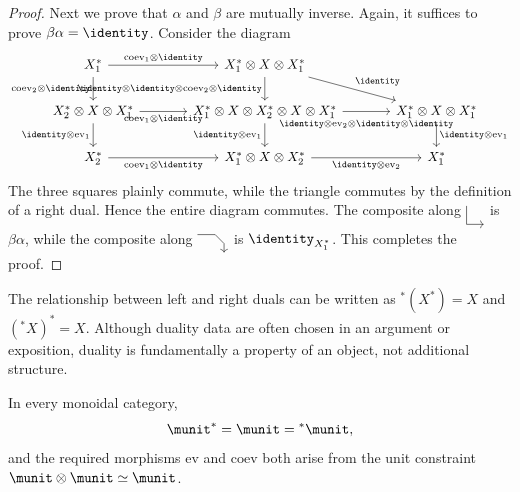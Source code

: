 \begin{proof}
	Next we prove that $\alpha$ and $\beta$ are mutually inverse. Again, it
	suffices to prove $\beta\alpha=\identity$. Consider the diagram
	\[\begin{tikzcd}[column sep=large]
		X_1^* \arrow[d, "{\mathrm{coev}_2 \otimes \identity}"'] \arrow[r, "{\mathrm{coev}_1 \otimes \identity}"] & X_1^* \otimes X \otimes X_1^* \arrow[d, "{\identity \otimes \identity \otimes \mathrm{coev}_2 \otimes \identity}"'] \arrow[rd, "\identity"] & \\
		X_2^* \otimes X \otimes X_1^* \arrow[r, "{\mathrm{coev}_1 \otimes \identity}"'] \arrow[d, "{\identity \otimes \mathrm{ev}_1}"'] & X_1^* \otimes X \otimes X_2^* \otimes X \otimes X_1^* \arrow[d, "{\identity \otimes \mathrm{ev}_1}"'] \arrow[r, "{\identity \otimes \mathrm{ev}_2 \otimes \identity \otimes \identity}"' inner sep=0.6em] &  X_1^* \otimes X \otimes X_1^* \arrow[d, "{\identity \otimes \mathrm{ev}_1}"] \\
		X_2^* \arrow[r, "{\mathrm{coev}_1 \otimes \identity}"'] & X_1^* \otimes X \otimes X_2^* \arrow[r, "{\identity \otimes \mathrm{ev}_2}"'] & X_1^*
	\end{tikzcd}\]
	The three squares plainly commute, while the triangle commutes by the
	definition of a right dual. Hence the entire diagram commutes. The
	composite along
	$\begin{tikzpicture}[baseline=(O), scale=0.45]
		\coordinate (O) at (0, 0.5);
		\draw[->] (0, 1) -- (0, 0) -- (1, 0);
	\end{tikzpicture}$
	is $\beta\alpha$, while the composite along
	$\begin{tikzpicture}[baseline=(O), scale=0.45]
		\coordinate (O) at (0, 0.5);
		\draw[->] (0, 1) -- (1, 1) -- (1.5, 0.5) -- (1.5, 0);
	\end{tikzpicture}$
	is $\identity_{X_1^*}$. This completes the proof.
\end{proof}

The relationship between left and right duals can be written as
${}^*(X^*)=X$ and $({}^*X)^*=X$. Although duality data are often chosen in
an argument or exposition, duality is fundamentally a property of an object,
not additional structure.

\begin{example}
	In every monoidal category,
	\[ \munit^* = \munit = {}^* \munit, \]
	and the required morphisms $\mathrm{ev}$ and $\mathrm{coev}$ both arise
	from the unit constraint $\munit\otimes\munit\simeq\munit$.
\end{example}

